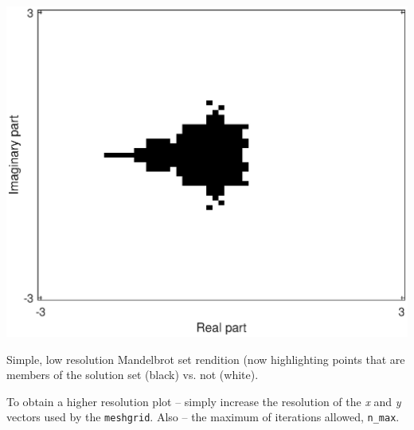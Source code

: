 \documentclass{tufte-book} %
\begin{document}
\begin{marginfigure}[0.0in]
\includegraphics[width=\linewidth]{ch4-brot00.eps}
\caption{Simple, low resolution Mandelbrot set rendition (now highlighting points that are members of the solution set (black) vs. not (white).}
\label{fig:ch4-brot00}
\end{marginfigure}

To obtain a higher resolution plot -- simply increase the resolution of the \textit{x} and \textit{y} vectors used by the \texttt{meshgrid}. Also -- the maximum of iterations allowed, \texttt{n\_max}.
\end{document}
